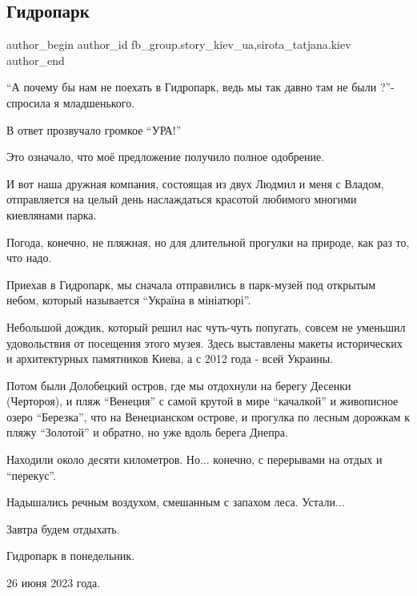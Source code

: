  
 
 
 
 

\subsection{Гидропарк}
\label{sec:28_06_2023.fb.fb_group.story_kiev_ua.1.gidropark}
 
\ifcmt
 author_begin
   author_id fb_group.story_kiev_ua,sirota_tatjana.kiev
 author_end
\fi

\enquote{А почему бы нам не поехать в Гидропарк, ведь мы так давно там не были ?}-
спросила я младшенького.

В ответ прозвучало громкое \enquote{УРА!}

Это означало, что моё предложение получило полное одобрение.

И вот наша дружная компания, состоящая из двух Людмил и меня с Владом,
отправляется на целый день наслаждаться красотой любимого многими киевлянами
парка.

Погода, конечно, не пляжная, но для длительной прогулки на природе, как раз то, что
надо.

Приехав в Гидропарк, мы сначала отправились в парк-музей под открытым
небом, который называется \enquote{Україна в мініатюрі}.

Небольшой дождик, который решил нас чуть-чуть попугать, совсем не уменьшил
удовольствия от посещения этого музея. Здесь выставлены макеты исторических и
архитектурных памятников Киева, а с 2012 года - всей Украины.

Потом были Долобецкий остров, где мы отдохнули на берегу Десенки (Чертороя), и
пляж \enquote{Венеция} с самой крутой в мире \enquote{качалкой} и живописное озеро
\enquote{Березка}, что на Венецианском острове, и прогулка по лесным дорожкам к пляжу
\enquote{Золотой} и обратно, но уже вдоль берега Днепра.

Находили около десяти километров. Но... конечно, с перерывами на отдых и
\enquote{перекус}.

Надышались речным воздухом, смешанным с запахом леса. Устали...

Завтра будем отдыхать.

Гидропарк в понедельник.

26 июня 2023 года.
